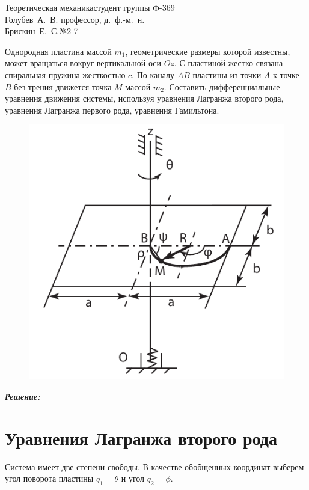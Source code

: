 



\usepackage{mathrsfs}
\renewcommand{\H}{\mathscr{H}}

{Теоретическая механика}{студент группы Ф-369\\{{ Голубев~А.~В. }}}
{профессор, д.~ф.-м.~н.\\Брискин~Е.~С.}{№2}{{{ 7 }}}

\setcounter{page}{2}

Однородная пластина массой \( m_1 \), геометрические размеры которой известны,
может вращаться вокруг вертикальной оси \( Oz \). С пластиной жестко связана
спиральная пружина жесткостью \( c \). По каналу \( AB \) пластины из точки
\( A \) к точке \( B \) без трения движется точка \( M \) массой \( m_2 \).
Составить дифференциальные уравнения движения системы, используя уравнения
Лагранжа второго рода, уравнения Лагранжа первого рода, уравнения Гамильтона.

\vspace{3em}

\begin{figure}[ht]
    \center
    \includegraphics[width=.5\textwidth]{picture}
\end{figure}

\emph{\textbf{Решение:}}

\section{Уравнения Лагранжа второго рода}
    Система имеет две степени свободы. В качестве обобщенных координат выберем
    угол поворота пластины \( q_1 = \theta \) и угол \( q_2 = \phi \).
    
